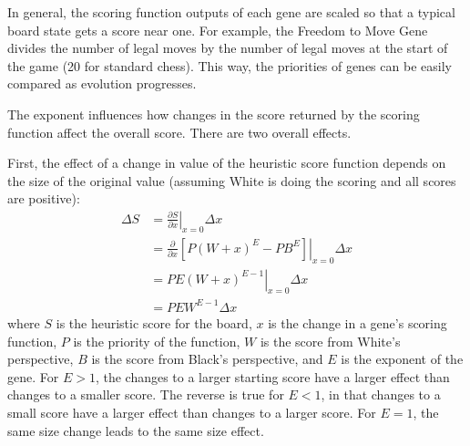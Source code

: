 \documentclass[letterpaper]{article}
\renewcommand{\_}{\allowbreak\textunderscore\allowbreak}
\begin{document}
In general, the scoring function outputs of each gene are scaled so that a typical board state gets a score near one. For example, the Freedom to Move Gene divides the number of legal moves by the number of legal moves at the start of the game (20 for standard chess). This way, the priorities of genes can be easily compared as evolution progresses.

The exponent influences how changes in the score returned by the scoring function affect the overall score. There are two overall effects.

First, the effect of a change in value of the heuristic score function depends on the size of the original value (assuming White is doing the scoring and all scores are positive):
\begin{align*}
\Delta S &= \left.\frac{\partial S}{\partial x}\right|_{x=0}\Delta x \\
		 &= \left.\frac{\partial}{\partial x}{\left[P{(W+x)}^E - PB^E\right]}\right|_{x=0} \Delta x \\
		 &= {\left.PE{(W+x)}^{E-1}\right|}_{x = 0} \Delta x \\
		 &= PEW^{E-1} \Delta x
\end{align*}
where \(S\) is the heuristic score for the board, \(x\) is the change in a gene's scoring function, \(P\) is the priority of the function, \(W\) is the score from White's perspective, \(B\) is the score from Black's perspective, and \(E\) is the exponent of the gene. For \(E > 1\), the changes to a larger starting score have a larger effect than changes to a smaller score. The reverse is true for \(E < 1\), in that changes to a small score have a larger effect than changes to a larger score. For \(E = 1\), the same size change leads to the same size effect.
\end{document}
